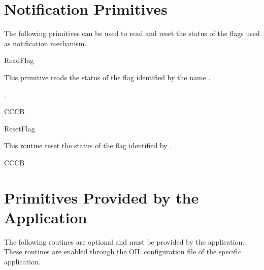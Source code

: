 \pagebreak


\section{Notification Primitives}
The following primitives can be used to read and reset the status of 
the flags used as notification mechanism.

\begin{function}{ReadFlag}
 \begin{fundescription}
   This primitive reads the status of the flag identified by the name .
 \end{fundescription}
 \begin{funreturn}
   .
 \end{funreturn}
 \begin{funconformance}
  CCCB
  \end{funconformance}
\end{function}

\begin{function}{ResetFlag}
  \begin{fundescription}
    This routine reset the status of the flag identified by .
   \end{fundescription}
   \begin{funconformance}
    CCCB
   \end{funconformance}
\end{function}



\pagebreak






\section{Primitives Provided by the Application}

The following routines are optional and must be provided by the application. 
These routines are enabled through the OIL configuration file 
of the specific application.

